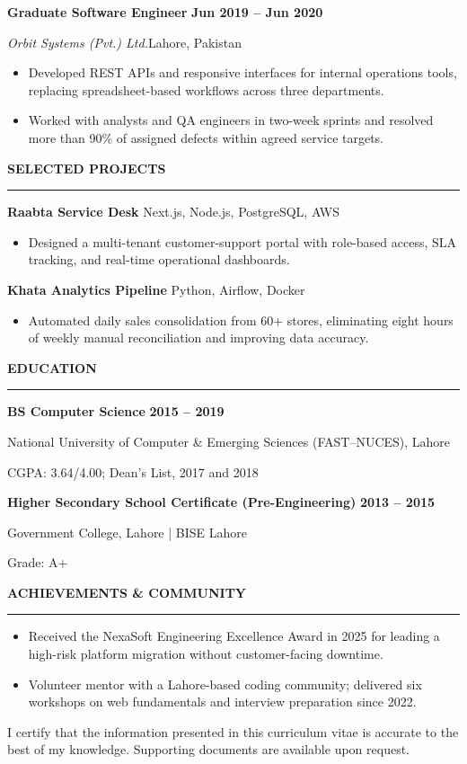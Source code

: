 \documentclass[10pt,a4paper]{article}
\newcommand{\cvsection}[1]{%
  \vspace{5pt}%
  {\fontsize{11.2}{12.5}\selectfont\bfseries\color{pakgreen}\MakeUppercase{#1}}\par
  \vspace{1pt}%
  {\color{crescent}\rule{\linewidth}{1.15pt}}\par
  \vspace{2pt}%
}
\newcommand{\job}[4]{%
  \textbf{\fontsize{10.5}{11.5}\selectfont\color{deepgreen}#1}\hfill
  {\fontsize{8.2}{9.2}\selectfont\bfseries\color{muted}#2}\par
  \textit{#3}\hfill{\fontsize{8.2}{9.2}\selectfont\color{muted}#4}\par
}
\newcommand{\education}[4]{%
  \textbf{\color{deepgreen}#1}\hfill
  {\fontsize{8.2}{9.2}\selectfont\bfseries\color{muted}#2}\par
  #3\par
  {\fontsize{8.2}{9.2}\selectfont\color{muted}#4}\par
}
\begin{document}
\begin{minipage}[t]{0.665\textwidth}
\vspace{2pt}
\job{Graduate Software Engineer}{Jun 2019 -- Jun 2020}
    {Orbit Systems (Pvt.) Ltd.}{Lahore, Pakistan}
\begin{itemize}
  \item Developed REST APIs and responsive interfaces for internal operations
        tools, replacing spreadsheet-based workflows across three departments.
  \item Worked with analysts and QA engineers in two-week sprints and resolved
        more than 90\% of assigned defects within agreed service targets.
\end{itemize}

\cvsection{Selected Projects}
\textbf{Raabta Service Desk}\hfill
{\small\color{muted}Next.js, Node.js, PostgreSQL, AWS}\par
\begin{itemize}
  \item Designed a multi-tenant customer-support portal with role-based access,
        SLA tracking, and real-time operational dashboards.
\end{itemize}

\vspace{1pt}
\textbf{Khata Analytics Pipeline}\hfill
{\small\color{muted}Python, Airflow, Docker}\par
\begin{itemize}
  \item Automated daily sales consolidation from 60+ stores, eliminating eight
        hours of weekly manual reconciliation and improving data accuracy.
\end{itemize}

\cvsection{Education}
\education{BS Computer Science}{2015 -- 2019}
  {National University of Computer \& Emerging Sciences (FAST--NUCES), Lahore}
  {CGPA: 3.64/4.00; Dean's List, 2017 and 2018}

\vspace{3pt}
\education{Higher Secondary School Certificate (Pre-Engineering)}{2013 -- 2015}
  {Government College, Lahore | BISE Lahore}
  {Grade: A+}

\cvsection{Achievements \& Community}
\begin{itemize}
  \item Received the NexaSoft Engineering Excellence Award in 2025 for leading
        a high-risk platform migration without customer-facing downtime.
  \item Volunteer mentor with a Lahore-based coding community; delivered six
        workshops on web fundamentals and interview preparation since 2022.
\end{itemize}

\vspace{2pt}
{\fontsize{7.5}{8.5}\selectfont\color{muted}
I certify that the information presented in this curriculum vitae is accurate
to the best of my knowledge. Supporting documents are available upon request.}

\end{minipage}
\end{document}
